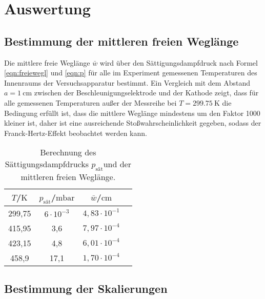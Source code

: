 \section{Auswertung}
\label{sec:Auswertung}
\FloatBarrier
\subsection{Bestimmung der mittleren freien Weglänge}
Die mittlere freie Weglänge $\bar{w}$ wird über den Sättigungsdampfdruck nach Formel \eqref{eqn:freiewegl} und \eqref{eqn:p} für alle im Experiment gemessenen Temperaturen des Innenraums der Versuchsapparatur bestimmt.
Ein Vergleich mit dem Abstand $a=\SI{1}{\centi\meter}$ zwischen der Beschleunigungselektrode und der Kathode zeigt, dass für alle gemessenen Temperaturen außer der Messreihe bei $T=\SI{299.75}{\kelvin}$ die Bedingung erfüllt ist, dass die mittlere Weglänge mindestens um den Faktor 1000 kleiner ist, daher ist eine ausreichende Stoßwahrscheinlichkeit gegeben, sodass der Franck-Hertz-Effekt beobachtet werden kann.
\begin{table}
	\centering
	\caption{Berechnung des Sättigungsdampfdrucks $p_\mathrm{sät}$und der mittleren freien Weglänge.}
	\label{tab:w}
\begin{tabular}{cccc}
\toprule
$T$/$\si{\kelvin}$ & $p_\mathrm{sät}$/$\si{\milli\bar}$ & $\bar{w}$/$\si{\centi\meter}$\\
\midrule
299,75 & $6\cdot10^{-3}$ & $4,83\cdot 10^{-1}$\\
415,95 & 3,6 & $7,97 \cdot 10^{-4}$\\%
423,15 & 4,8 &$6,01 \cdot 10^{-4}$\\%
458,9 & 17,1& $1,70\cdot 10^{-4}$\\
\bottomrule
\end{tabular}
\end{table}


\FloatBarrier
\subsection{Bestimmung der Skalierungen}

